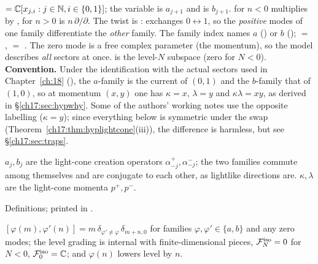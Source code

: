 \begin{dictionary}
 $={\mathbb{C}}[x_{j,i}:j\in{\mathbb{N}},i\in\{0,1\}]$; the variable  is $a_{j+1}$ and  is
$b_{j+1}$.   for $n<0$ multiplies by , for $n>0$ is $n\,\partial/\partial$.
The twist is :  exchanges $0\leftrightarrow1$, so the \emph{positive} modes of one family
differentiate the \emph{other} family.  The family index  names $a$ () or $b$ ();
 $=$ ,  $=$ .  The zero mode
 is a free complex parameter (the momentum), so the model describes \emph{all} sectors at once.
 is the level-$N$ subspace (zero for $N<0$).  \textbf{Convention.} Under the
identification with the actual sectors used in Chapter~\ref{ch:18} (),
the $a$-family is the current of $(0,1)$ and the $b$-family that of $(1,0)$, so at momentum $(x,y)$ one has
$\kappa=x$, $\lambda=y$ and $\kappa\lambda=xy$, as derived in \S\ref{ch17:sec:hypwhy}.  Some of the authors' working notes use the opposite
labelling ($\kappa=y$); since everything below is symmetric under the swap (Theorem~\ref{ch17:thm:hyplightcone}(iii)), the
difference is harmless, but see \S\ref{ch17:sec:traps}.
\end{dictionary}

\begin{physics}
$a_j,b_j$ are the light-cone creation operators $\alpha^+_{-j},\alpha^-_{-j}$; the two families commute among
themselves and are conjugate to each other, as lightlike directions are.  $\kappa,\lambda$ are the light-cone
momenta $p^+,p^-$.
\end{physics}

\begin{status}
Definitions; printed in .
\end{status}

\begin{theorem}\label{ch17:thm:hypheis}
$[\varphi(m),\varphi'(n)]=m\,\delta_{\varphi'\ne\varphi}\,\delta_{m+n,0}$ for families $\varphi,\varphi'\in\{a,b\}$ and any zero modes; the level
grading is internal with finite-dimensional pieces, $\mathcal{F}^{\mathrm{iso}}_N=0$ for $N<0$,
$\mathcal{F}^{\mathrm{iso}}_0={\mathbb{C}}$; and $\varphi(n)$ lowers level by $n$.
\end{theorem}

